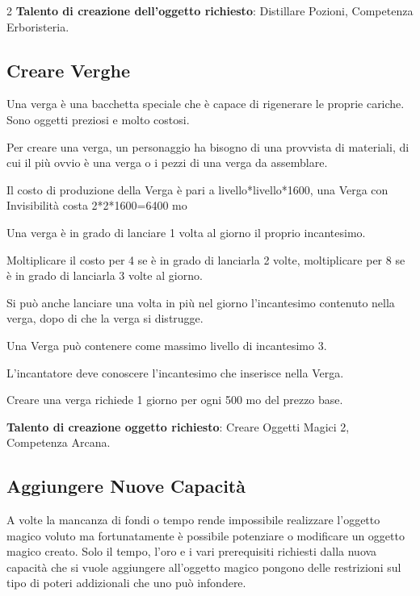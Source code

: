 \begin{multicols}{2}
\textbf{Talento di creazione dell'oggetto richiesto}: Distillare Pozioni, Competenza Erboristeria.

\subsection{Creare Verghe}\label{creareverghe}

Una verga è una bacchetta speciale che è capace di rigenerare le proprie cariche. Sono oggetti preziosi e molto costosi.

Per creare una verga, un personaggio ha bisogno di una provvista di materiali, di cui il più ovvio è una verga o i pezzi di una verga da assemblare.

\medskip

Il costo di produzione della Verga è pari a livello*livello*1600, una Verga con Invisibilità costa 2*2*1600=6400 mo

\bigskip

Una verga è in grado di lanciare 1 volta al giorno il proprio incantesimo.

Moltiplicare il costo per 4 se è in grado di lanciarla 2 volte, moltiplicare per 8 se è in grado di lanciarla 3 volte al giorno.

Si può anche lanciare una volta in più nel giorno l'incantesimo contenuto nella verga, dopo di che la verga si distrugge.

Una Verga può contenere come massimo livello di incantesimo 3.

L'incantatore deve conoscere l'incantesimo che inserisce nella Verga.

Creare una verga richiede 1 giorno per ogni 500 mo del prezzo base.

\textbf{Talento di creazione oggetto richiesto}: Creare Oggetti Magici 2, Competenza Arcana.

\subsection{Aggiungere Nuove Capacità}\label{aggiungerecapacitamagiche}

A volte la mancanza di fondi o tempo rende impossibile realizzare l'oggetto magico voluto ma fortunatamente è possibile potenziare o modificare un oggetto magico creato. Solo il tempo, l'oro e i vari prerequisiti richiesti dalla nuova capacità che si vuole aggiungere all'oggetto magico pongono delle restrizioni sul tipo di poteri addizionali che uno può infondere.


\end{multicols}

